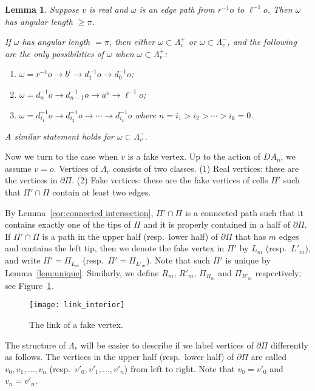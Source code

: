 \documentclass[11pt]{amsart}
\newtheorem{lemma}[theorem]{Lemma}
\theoremstyle{definition}
\newcommand{\lemfiveeleven}{Lemma 5.11}
\begin{document}
\begin{lemma}	\cite[\lemfiveeleven]{Artinmetric}
	\label{lem:exactly pi}
	Suppose $v$ is real and $\omega$ is an edge path from $r^{-1}o$ to $\ell^{-1}o$. Then $\omega$ has angular length $\ge \pi$. 
	
	If $\omega$ has angular length $=\pi$, then either $\omega\subset\Lambda^+_v$ or $\omega\subset\Lambda^-_v$, and the following are the only possibilities of $\omega$ when $\omega\subset\Lambda^+_v$:
	\begin{enumerate}
		\item $\omega=r^{-1}o\to b^i\to d^{-1}_{1}o\to d^{-1}_{0}o$;
		\item $\omega=d^{-1}_{n}o\to d^{-1}_{n-1}o\to a^o\to \ell^{-1}o$;
		\item $\omega=d^{-1}_{i_1}o\to d^{-1}_{i_2}o\to\cdots\to d^{-1}_{i_k}o$ where $n=i_1>i_2>\cdots>i_k=0$.
	\end{enumerate}
	A similar statement holds for $\omega\subset\Lambda^-_v$.
\end{lemma}

Now we turn to the case when $v$ is a fake vertex. Up to the action of $DA_n$, we assume $v=o$. Vertices of $\Lambda_v$ consists of two classes. (1) Real vertices: these are the vertices in $\partial\Pi$. (2) Fake vertices: these are the fake vertices of cells $\Pi'$ such that $\Pi'\cap\Pi$ contain at least two edges.

By Lemma~\ref{cor:connected intersection}, $\Pi'\cap \Pi$ is a connected path such that it contains exactly one of the tips of $\Pi$ and it is properly contained in a half of $\partial\Pi$. If $\Pi'\cap \Pi$ is a path in the upper half (resp.\ lower half) of $\partial\Pi$ that has $m$ edges and contains the left tip, then we denote the fake vertex in $\Pi'$ by $L_m$ (resp.\ $L'_m$), and write $\Pi'=\Pi_{L_m}$ (resp.\ $\Pi'=\Pi_{L'_m}$). Note that such $\Pi'$ is unique by Lemma~\ref{lem:unique}. Similarly, we define $R_m$, $R'_m$, $\Pi_{R_m}$ and $\Pi_{R'_m}$ respectively; see Figure~\ref{f:fake}. 
\begin{figure}[ht!]
	\centering
	\texttt{[image: link\_interior]}
	\caption{The link of a fake vertex.}
	\label{f:fake}
\end{figure}

The structure of $\Lambda_v$ will be easier to describe if we label vertices of $\partial\Pi$ differently as follows. The vertices in the upper half (resp.\ lower half) of $\partial\Pi$ are called $v_0,v_1,\ldots,v_n$ (resp.\ $v'_0,v'_1,\ldots,v'_n$) from left to right. Note that $v_0=v'_0$ and $v_n=v'_n$.
\end{document}
